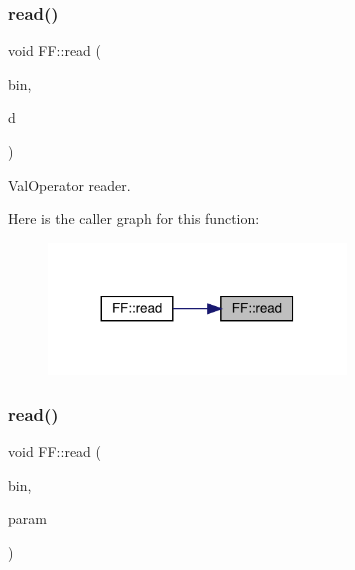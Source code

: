 \subsubsection{\texorpdfstring{read()}{read()}\hspace{0.1cm}{\footnotesize\ttfamily [13/14]}}
{\footnotesize\ttfamily void F\+F\+::read (\begin{DoxyParamCaption}\item[{\mbox{\hyperlink{classADATIO_1_1BinaryReader}{Binary\+Reader}} \&}]{bin,  }\item[{\mbox{\hyperlink{classFF_1_1DiscoValOperator__t}{Disco\+Val\+Operator\+\_\+t}} \&}]{d }\end{DoxyParamCaption})}



Val\+Operator reader. 

Here is the caller graph for this function\+:\nopagebreak
\begin{figure}[H]
\begin{center}
\leavevmode
\includegraphics[width=224pt]{d5/da6/namespaceFF_adbbf0211a7578841555412497b4f18c4_icgraph}
\end{center}
\end{figure}
\mbox{\label{namespaceFF_a257b587cc1107da7cde8c3d17ea5ce50}} 
\subsubsection{\texorpdfstring{read()}{read()}\hspace{0.1cm}{\footnotesize\ttfamily [14/14]}}
{\footnotesize\ttfamily void F\+F\+::read (\begin{DoxyParamCaption}\item[{\mbox{\hyperlink{classADATIO_1_1BinaryReader}{Binary\+Reader}} \&}]{bin,  }\item[{\mbox{\hyperlink{structFF_1_1KeyHadron3PtCorr__t}{Key\+Hadron3\+Pt\+Corr\+\_\+t}} \&}]{param }\end{DoxyParamCaption})}



